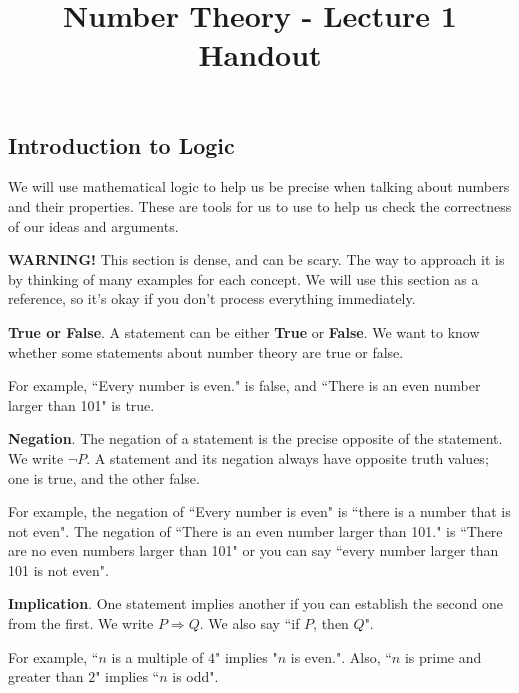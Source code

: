 \documentclass[11pt]{article}
\theoremstyle{definition}
\numberwithin{thm}{section}
\begin{document}
\title{Number Theory - Lecture 1 Handout}

\maketitle


\subsection{Introduction to Logic}

We will use mathematical logic to help us be precise when talking about numbers and their properties. These are tools for us to use to help us check the correctness of our ideas and arguments.

\textbf{WARNING!} This section is dense, and can be scary. The way to approach it is by thinking of many examples for each concept. We will use this section as a reference, so it's okay if you don't process everything immediately.

\textbf{True or False}. A statement can be either \textbf{True} or \textbf{False}. We want to know whether some statements about number theory are true or false. 

For example, ``Every number is even." is false, and ``There is an even number larger than 101" is true.

\textbf{Negation}. The negation of a statement is the precise opposite of the statement. We write $\neg P$. A statement and its negation always have opposite truth values; one is true, and the other false. 

For example, the negation of ``Every number is even" is ``there is a number that is not even". The negation of ``There is an even number larger than 101." is ``There are no even numbers larger than 101" or you can say ``every number larger than 101 is not even". 

\textbf{Implication}. One statement implies another if you can establish the second one from the first. We write $P \Rightarrow Q$. We also say ``if $P$, then $Q$".

For example, ``$n$ is a multiple of $4$" implies "$n$ is even.". Also, ``$n$ is prime and greater than $2$" implies ``$n$ is odd".
\end{document}
